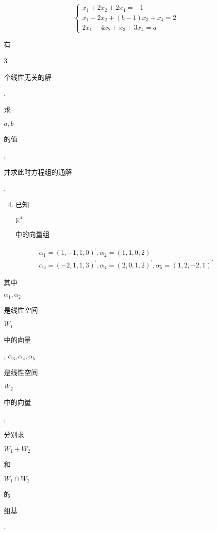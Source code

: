 \documentclass[10pt]{article}
\begin{document}
$$
\left\{\begin{array}{l}
x_{1}+2 x_{2}+2 x_{4}=-1 \\
x_{1}-2 x_{2}+(b-1) x_{3}+x_{4}=2 \\
2 x_{1}-4 x_{2}+x_{3}+3 x_{4}=a
\end{array}\right.
$$
\begin{CJK}{UTF8}{mj}有\end{CJK} 3 \begin{CJK}{UTF8}{mj}个线性无关的解\end{CJK}, \begin{CJK}{UTF8}{mj}求\end{CJK} $a, b$ \begin{CJK}{UTF8}{mj}的值\end{CJK}, \begin{CJK}{UTF8}{mj}并求此时方程组的通解\end{CJK}.

\begin{enumerate}
  \setcounter{enumi}{3}
  \item \begin{CJK}{UTF8}{mj}已知\end{CJK} $\mathbb{R}^{4}$ \begin{CJK}{UTF8}{mj}中的向量组\end{CJK}
\end{enumerate}
$$
\begin{gathered}
\alpha_{1}=(1,-1,1,0)^{\prime}, \alpha_{2}=(1,1,0,2) \\
\alpha_{3}=(-2,1,1,3)^{\prime}, \alpha_{4}=(2,0,1,2)^{\prime}, \alpha_{5}=(1,2,-2,1)^{\prime}
\end{gathered}
$$
\begin{CJK}{UTF8}{mj}其中\end{CJK} $\alpha_{1}, \alpha_{2}$ \begin{CJK}{UTF8}{mj}是线性空间\end{CJK} $W_{1}$ \begin{CJK}{UTF8}{mj}中的向量\end{CJK}, $\alpha_{3}, \alpha_{4}, \alpha_{5}$ \begin{CJK}{UTF8}{mj}是线性空间\end{CJK} $W_{2}$ \begin{CJK}{UTF8}{mj}中的向量\end{CJK}, \begin{CJK}{UTF8}{mj}分别求\end{CJK} $W_{1}+W_{2}$ \begin{CJK}{UTF8}{mj}和\end{CJK} $W_{1} \cap W_{2}$ \begin{CJK}{UTF8}{mj}的\end{CJK} \begin{CJK}{UTF8}{mj}组基\end{CJK}.
\end{document}
